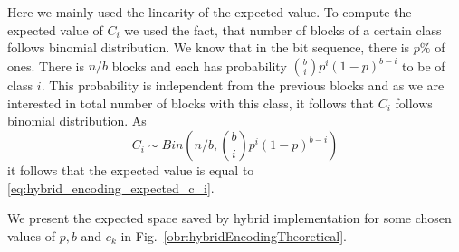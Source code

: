 Here we mainly used the linearity of the expected value. To compute the expected value of
$C_i$ we used the fact, that number of blocks of a certain class follows binomial
distribution. We know that in the bit sequence, there is $p\%$ of ones. There is $n/b$ blocks
and each has probability ${b\choose i}p^i(1-p)^{b-i}$ to be of class $i$. This probability
is independent from the previous blocks and as we are interested in total number of blocks with
this class, it follows that $C_i$ follows binomial distribution. As
$$C_i \sim Bin\left(n/b, {b\choose i}p^i(1-p)^{b-i}\right)$$ it follows that the expected value is equal to
\ref{eq:hybrid_encoding_expected_c_i}.

We present the expected space saved by hybrid implementation for some chosen values of
$p, b$ and $c_k$ in Fig.~\ref{obr:hybridEncodingTheoretical}.
